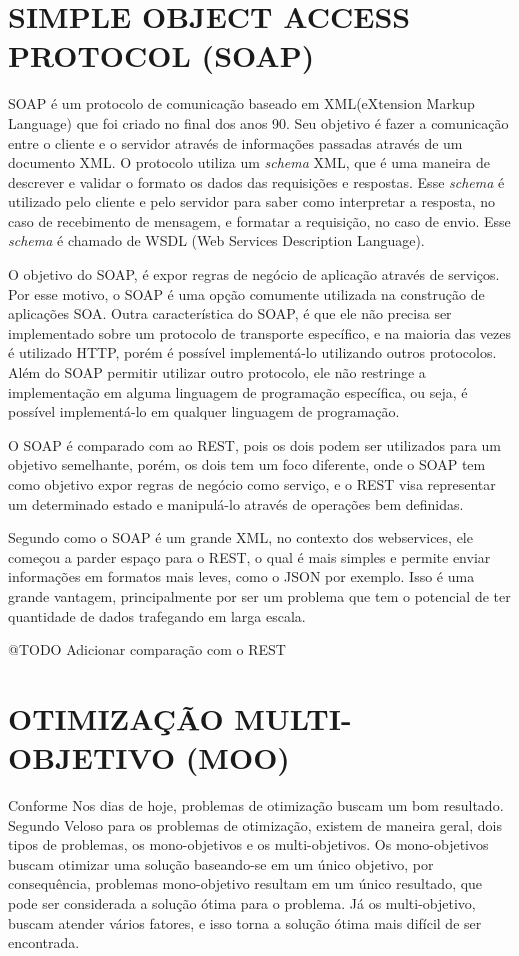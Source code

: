 \section{SIMPLE OBJECT ACCESS PROTOCOL (SOAP)}
SOAP é um protocolo de comunicação baseado em XML(eXtension Markup Language) que foi criado no final 
dos anos 90. Seu objetivo é fazer a comunicação entre o cliente e o servidor através de informações 
passadas através de um documento XML. O protocolo utiliza um \textit{schema} XML, que é uma 
maneira de descrever e validar o formato os dados das requisições e respostas. 
Esse \textit{schema} é utilizado pelo cliente e pelo servidor para saber como interpretar 
a resposta, no caso de recebimento de mensagem, e formatar a requisição, no caso de envio.
Esse \textit{schema} é chamado de WSDL (Web Services Description Language).

O objetivo do SOAP, é expor regras de negócio de aplicação através de serviços. 
Por esse motivo, o SOAP é uma opção comumente utilizada na construção de aplicações SOA. 
Outra característica do SOAP, é que ele não precisa ser implementado sobre um protocolo de 
transporte específico, e na maioria das vezes é utilizado HTTP, porém é possível implementá-lo
utilizando outros protocolos. Além do SOAP permitir utilizar outro protocolo, 
ele não restringe a implementação em alguma linguagem de programação específica, ou seja,
é possível implementá-lo em qualquer linguagem de programação.

O SOAP é comparado com ao REST, pois os dois podem ser utilizados para um objetivo 
semelhante, porém, os dois tem um foco diferente, onde o SOAP tem como objetivo expor regras de negócio 
como serviço, e o REST visa representar um determinado estado e manipulá-lo através de operações 
bem definidas.

Segundo \cite{lecheta} como o SOAP é um grande XML, no contexto dos webservices, ele começou
a parder espaço para o REST, o qual é mais simples 
e permite enviar informações em formatos mais leves, como o JSON por exemplo. 
Isso é uma grande vantagem, principalmente por ser um problema
que tem o potencial de ter quantidade de dados trafegando em larga escala.

@TODO Adicionar comparação com o REST

\section{OTIMIZAÇÃO MULTI-OBJETIVO (MOO)}  
Conforme Nos dias de hoje, problemas de otimização buscam um bom resultado.
Segundo Veloso \cite{veloso} para os problemas de otimização, existem de maneira geral, 
dois tipos de problemas, os mono-objetivos e os multi-objetivos. 
Os mono-objetivos buscam otimizar uma solução baseando-se em um único objetivo, por consequência, 
problemas mono-objetivo resultam em um único resultado, que pode ser considerada a solução ótima para o 
problema. Já os multi-objetivo, buscam atender vários fatores, e isso torna a solução ótima mais 
difícil de ser encontrada.

